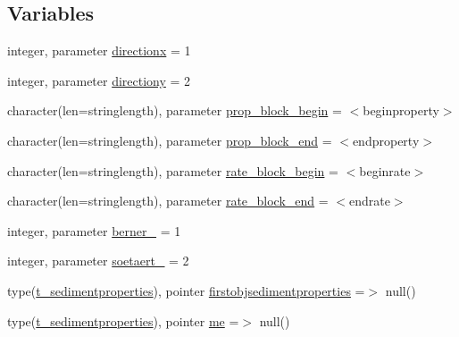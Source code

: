 \subsection*{Variables}
\begin{DoxyCompactItemize}
\item 
integer, parameter \mbox{\hyperlink{namespacemodulesedimentproperties_a5247c2651bb8337f376c5dd0f2361aaf}{directionx}} = 1
\item 
integer, parameter \mbox{\hyperlink{namespacemodulesedimentproperties_a9a8b1a17570f1df269060a1654bdf5ef}{directiony}} = 2
\item 
character(len=stringlength), parameter \mbox{\hyperlink{namespacemodulesedimentproperties_a73a755739b1824b540e415040e452dd1}{prop\+\_\+block\+\_\+begin}} = \textquotesingle{}$<$beginproperty$>$\textquotesingle{}
\item 
character(len=stringlength), parameter \mbox{\hyperlink{namespacemodulesedimentproperties_a09d22580c2dcefeb433a3f90db04162f}{prop\+\_\+block\+\_\+end}} = \textquotesingle{}$<$endproperty$>$\textquotesingle{}
\item 
character(len=stringlength), parameter \mbox{\hyperlink{namespacemodulesedimentproperties_a21424bbfa6662992068ecdf9dd2e03f4}{rate\+\_\+block\+\_\+begin}} = \textquotesingle{}$<$beginrate$>$\textquotesingle{}
\item 
character(len=stringlength), parameter \mbox{\hyperlink{namespacemodulesedimentproperties_a2e2e7559aa8c8708cccfcdb16838b81c}{rate\+\_\+block\+\_\+end}} = \textquotesingle{}$<$endrate$>$\textquotesingle{}
\item 
integer, parameter \mbox{\hyperlink{namespacemodulesedimentproperties_a0429cf8f172c33e1391f764cb417b5f7}{berner\+\_}} = 1
\item 
integer, parameter \mbox{\hyperlink{namespacemodulesedimentproperties_ae07ece7c5ad38509d6958e1386cd9cdf}{soetaert\+\_}} = 2
\item 
type(\mbox{\hyperlink{structmodulesedimentproperties_1_1t__sedimentproperties}{t\+\_\+sedimentproperties}}), pointer \mbox{\hyperlink{namespacemodulesedimentproperties_ae4106df46f5b0fe3f153269bc770d4f2}{firstobjsedimentproperties}} =$>$ null()
\item 
type(\mbox{\hyperlink{structmodulesedimentproperties_1_1t__sedimentproperties}{t\+\_\+sedimentproperties}}), pointer \mbox{\hyperlink{namespacemodulesedimentproperties_af58fccfc55bef421fc4ec051db33d596}{me}} =$>$ null()
\end{DoxyCompactItemize}


